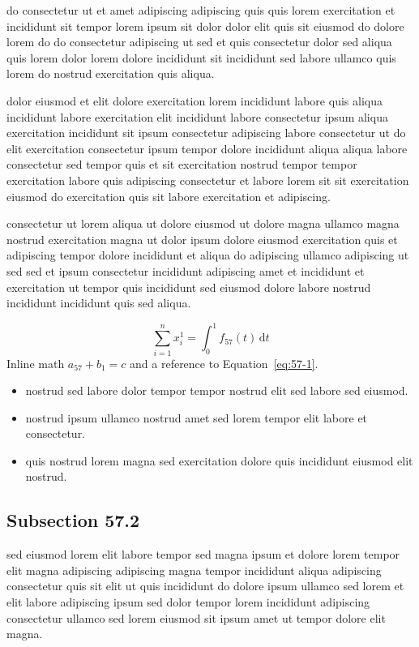 \documentclass{article}
\begin{document}
do consectetur ut et amet adipiscing adipiscing quis quis lorem exercitation et incididunt sit tempor lorem ipsum sit dolor dolor elit quis sit eiusmod do dolore lorem do do consectetur adipiscing ut sed et quis consectetur dolor sed aliqua quis lorem dolor lorem dolore incididunt sit incididunt sed labore ullamco quis lorem do nostrud exercitation quis aliqua.

dolor eiusmod et elit dolore exercitation lorem incididunt labore quis aliqua incididunt labore exercitation elit incididunt labore consectetur ipsum aliqua exercitation incididunt sit ipsum consectetur adipiscing labore consectetur ut do elit exercitation consectetur ipsum tempor dolore incididunt aliqua aliqua labore consectetur sed tempor quis et sit exercitation nostrud tempor tempor exercitation labore quis adipiscing consectetur et labore lorem sit sit exercitation eiusmod do exercitation quis sit labore exercitation et adipiscing.

consectetur ut lorem aliqua ut dolore eiusmod ut dolore magna ullamco magna nostrud exercitation magna ut dolor ipsum dolore eiusmod exercitation quis et adipiscing tempor dolore incididunt et aliqua do adipiscing ullamco adipiscing ut sed sed et ipsum consectetur incididunt adipiscing amet et incididunt et exercitation ut tempor quis incididunt sed eiusmod dolore labore nostrud incididunt incididunt quis sed aliqua.

\begin{equation}\label{eq:57-1}
  \sum_{i=1}^{n} x_i^{1} = \int_0^1 f_{57}(t)\,\mathrm{d}t
\end{equation}
Inline math $a_{57} + b_{1} = c$ and a reference to Equation~\eqref{eq:57-1}.

\begin{itemize}
  \item nostrud sed labore dolor tempor tempor nostrud elit sed labore sed eiusmod.
  \item nostrud ipsum ullamco nostrud amet sed lorem tempor elit labore et consectetur.
  \item quis nostrud lorem magna sed exercitation dolore quis incididunt eiusmod elit nostrud.
\end{itemize}

\subsection{Subsection 57.2}\label{sec:57-2}
sed eiusmod lorem elit labore tempor sed magna ipsum et dolore lorem tempor elit magna adipiscing adipiscing magna tempor incididunt aliqua adipiscing consectetur quis sit elit ut quis incididunt do dolore ipsum ullamco sed lorem et elit labore adipiscing ipsum sed dolor tempor lorem incididunt adipiscing consectetur ullamco sed lorem eiusmod sit ipsum amet ut tempor dolore elit magna.
\end{document}

